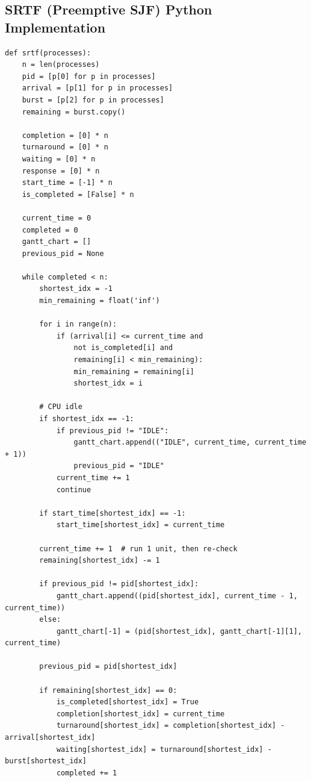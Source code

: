 \documentclass[12pt, a4paper]{article}
\begin{document}
\subsection*{SRTF (Preemptive SJF) Python Implementation}
\begin{lstlisting}
def srtf(processes):
    n = len(processes)
    pid = [p[0] for p in processes]
    arrival = [p[1] for p in processes]
    burst = [p[2] for p in processes]
    remaining = burst.copy()
    
    completion = [0] * n
    turnaround = [0] * n
    waiting = [0] * n
    response = [0] * n
    start_time = [-1] * n
    is_completed = [False] * n
    
    current_time = 0
    completed = 0
    gantt_chart = []
    previous_pid = None
    
    while completed < n:
        shortest_idx = -1
        min_remaining = float('inf')
        
        for i in range(n):
            if (arrival[i] <= current_time and 
                not is_completed[i] and 
                remaining[i] < min_remaining):
                min_remaining = remaining[i]
                shortest_idx = i
                
        # CPU idle
        if shortest_idx == -1:
            if previous_pid != "IDLE":
                gantt_chart.append(("IDLE", current_time, current_time + 1))
                previous_pid = "IDLE"
            current_time += 1
            continue
            
        if start_time[shortest_idx] == -1:
            start_time[shortest_idx] = current_time
            
        current_time += 1  # run 1 unit, then re-check
        remaining[shortest_idx] -= 1
        
        if previous_pid != pid[shortest_idx]:
            gantt_chart.append((pid[shortest_idx], current_time - 1, current_time))
        else:
            gantt_chart[-1] = (pid[shortest_idx], gantt_chart[-1][1], current_time)
            
        previous_pid = pid[shortest_idx]
        
        if remaining[shortest_idx] == 0:
            is_completed[shortest_idx] = True
            completion[shortest_idx] = current_time
            turnaround[shortest_idx] = completion[shortest_idx] - arrival[shortest_idx]
            waiting[shortest_idx] = turnaround[shortest_idx] - burst[shortest_idx]
            completed += 1
            

\end{lstlisting}
\end{document}
